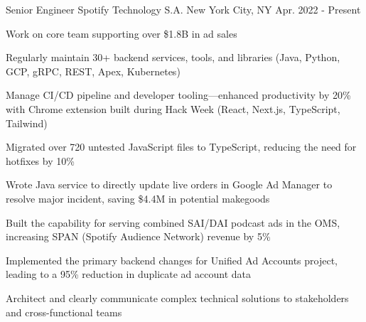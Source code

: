 

\begin{cventries}

  \cventry
    {Senior Engineer} %
    {Spotify Technology S.A.} %
    {New York City, NY} %
    {Apr. 2022 - Present} %
    {
      \begin{cvitems} 
        \item {Work on core team supporting over \$1.8B in ad sales}
        \item {Regularly maintain 30+ backend services, tools, and libraries (Java, Python, GCP, gRPC, REST, Apex, Kubernetes)}
        \item {Manage CI/CD pipeline and developer tooling---enhanced productivity by 20\% with Chrome extension built during Hack Week (React, Next.js, TypeScript, Tailwind)}
        \item {Migrated over 720 untested JavaScript files to TypeScript, reducing the need for hotfixes by 10\%}
        \item {Wrote Java service to directly update live orders in Google Ad Manager to resolve major incident, saving \$4.4M in potential makegoods}
        \item {Built the capability for serving combined SAI/DAI podcast ads in the OMS, increasing SPAN (Spotify Audience Network) revenue by 5\%}
        \item {Implemented the primary backend changes for Unified Ad Accounts project, leading to a 95\% reduction in duplicate ad account data}
        \item {Architect and clearly communicate complex technical solutions to stakeholders and cross-functional teams}
      \end{cvitems}
    }


\end{cventries}
